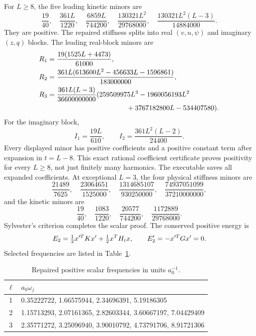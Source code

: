 \documentclass[11pt]{article}
\numberwithin{equation}{section}
\begin{document}
For $L\ge8$, the five leading kinetic minors are
\begin{equation}
 \frac{19}{40},\quad\frac{361L}{1220},\quad\frac{6859L}{744200},\quad
 \frac{130321L^2}{29768000},\quad\frac{130321L^2(L-3)}{14884000}.
\end{equation}
They are positive.
The repaired stiffness splits into real $(v,u,\psi)$ and imaginary $(z,q)$ blocks.
The leading real-block minors are
\begin{align}
 R_1&=\frac{19(1525L+4473)}{61000},\\
 R_2&=\frac{361L(613600L^2-456633L-1596861)}{183000000},\\
 R_3&=\frac{361L(L-3)}{36600000000}
 (259509975L^3-1960056193L^2\nonumber\\
 &\hspace{40mm}+3767182800L-534407580).
\end{align}
For the imaginary block,
\begin{equation}
 I_1=\frac{19L}{610},\qquad I_2=\frac{361L^2(L-2)}{24400}.
\end{equation}
Every displayed minor has positive coefficients and a positive constant term after expansion in $t=L-8$.
This exact rational coefficient certificate proves positivity for every $L\ge8$, not just finitely many harmonics.
The executable saves all expanded coefficients.
At exceptional $L=3$, the four physical stiffness minors are
\begin{equation}
 \frac{21489}{7625},\quad\frac{23064651}{1525000},\quad
 \frac{1314685107}{930250000},\quad\frac{74937051099}{37210000000},
\end{equation}
and the kinetic minors are
\begin{equation}
 \frac{19}{40},\quad\frac{1083}{1220},\quad\frac{20577}{744200},\quad
 \frac{1172889}{29768000}.
\end{equation}
Sylvester's criterion completes the scalar proof.
The conserved positive energy is
\begin{equation}
 E_2=\tfrac12x'^TKx'+\tfrac12x^TH_{\rm r}x,\qquad
 E_2'=-x'^TGx'=0.
 \label{eq:energy}
\end{equation}
Selected frequencies are listed in Table~\ref{tab:freq}.

\begin{table}[htbp]
\centering
\caption{Repaired positive scalar frequencies in units $a_0^{-1}$.}
\label{tab:freq}
\begin{tabular}{cl}\toprule
$\ell$&$a_0\omega_j$\\\midrule
1&0.35222722, 1.66575944, 2.34696391, 5.19186305\\
2&1.15713293, 2.07161365, 2.82603344, 3.60667197, 7.04429409\\
3&2.35771272, 3.25096940, 3.90010792, 4.73791706, 8.91721306\\\bottomrule
\end{tabular}
\end{table}
\end{document}
